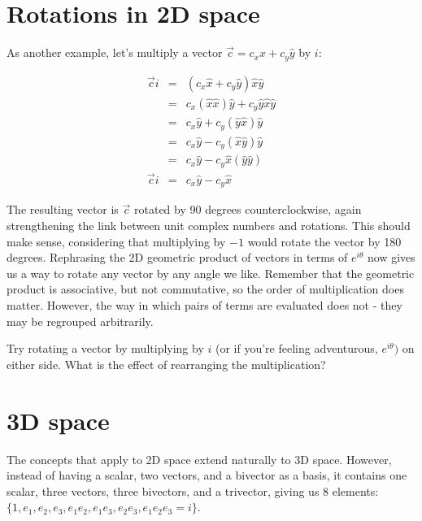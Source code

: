 \section{Rotations in 2D space}

As another example, let's multiply a vector $\vec{c} = c_{x}\hat{x} + c_{y}\hat{y}$ by $i$:

\begin{eqnarray*}
    \vec{c}i &=& \left(c_{x}\hat{x} + c_{y}\hat{y}\right)\hat{x}\hat{y} \\
    &=& c_{x}\left(\hat{x}\hat{x}\right)\hat{y} + c_{y}\hat{y}\hat{x}\hat{y} \\
    &=& c_{x}\hat{y} + c_{y}\left(\hat{y}\hat{x}\right)\hat{y} \\
    &=& c_{x}\hat{y} - c_{y}\left(\hat{x}\hat{y}\right)\hat{y} \\
    &=& c_{x}\hat{y} - c_{y}\hat{x}\left(\hat{y}\hat{y}\right) \\
    \vec{c}i &=& c_{x}\hat{y} - c_{y}\hat{x}
\end{eqnarray*}

The resulting vector is $\vec{c}$ rotated by 90 degrees counterclockwise, again strengthening the
link between unit complex numbers and rotations. This should make sense, considering that 
multiplying by $-1$ would rotate the vector by 180 degrees. Rephrasing the 2D geometric product of
vectors in terms of $e^{i\theta}$ now gives us a way to rotate any vector by any angle we like.
Remember that the geometric product is associative, but not commutative, so the order of 
multiplication does matter. However, the way in which pairs of terms are evaluated does not - they
may be regrouped arbitrarily.

\begin{expl}
    Try rotating a vector by multiplying by $i$ (or if you're feeling adventurous, $e^{i\theta})$
    on either side. What is the effect of rearranging the multiplication?
\end{expl}

\section{3D space}

The concepts that apply to 2D space extend naturally to 3D space. However, instead of having a
scalar, two vectors, and a bivector as a basis, it contains one scalar, three vectors, three 
bivectors, and a trivector, giving us 8 elements: $\{1, e_1, e_2, e_3, e_{1}e_{2}, e_{1}e_{3},
e_{2}e_{3}, e_{1}e_{2}e_{3} = i\}$.

